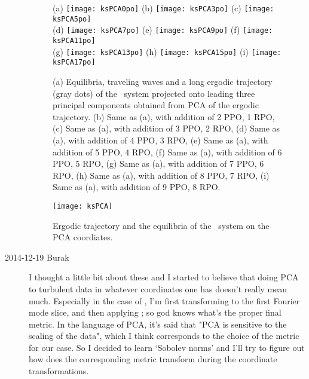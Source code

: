 \begin{description}
\begin{figure}%
\begin{center}
   (a) \texttt{[image: ksPCA0po]}
   (b) \texttt{[image: ksPCA3po]}
   (c) \texttt{[image: ksPCA5po]} \\
   (d) \texttt{[image: ksPCA7po]}
   (e) \texttt{[image: ksPCA9po]}
   (f) \texttt{[image: ksPCA11po]} \\
   (g) \texttt{[image: ksPCA13po]}
   (h) \texttt{[image: ksPCA15po]}
   (i) \texttt{[image: ksPCA17po]}
\end{center}
   \caption{(a) Equilibria, traveling waves and a long ergodic
         trajectory (gray dots) of the \KS\ system projected
         onto leading three principal components obtained
         from PCA of the ergodic trajectory.
         (b) Same as (a), with addition of 2 PPO, 1 RPO,
         (c) Same as (a), with addition of 3 PPO, 2 RPO,
         (d) Same as (a), with addition of 4 PPO, 3 RPO,
         (e) Same as (a), with addition of 5 PPO, 4 RPO,
         (f) Same as (a), with addition of 6 PPO, 5 RPO,
         (g) Same as (a), with addition of 7 PPO, 6 RPO,
         (h) Same as (a), with addition of 8 PPO, 7 RPO,
         (i) Same as (a), with addition of 9 PPO, 8 RPO.
         }
  \label{f-ksPCAnpo}
\end{figure}


\begin{figure}[h]
  \centering
  \texttt{[image: ksPCA]}
  \caption{Ergodic trajectory and the equilibria of the \KS\ system on
         the PCA coordiates.}
  \label{f-ksPCA}
\end{figure}

\item[2014-12-19 Burak] I thought a little bit about these and I started to
believe that doing PCA to turbulent data in whatever coordinates one has
doesn't really mean much. Especially in the case of \KS , I'm first
transforming to the first Fourier mode slice, and then applying
; so god knows what's the proper final metric. In the
language of PCA, it's said that "PCA is sensitive to the scaling of the
data", which I think corresponds to the choice of the metric for our case.
So I decided to learn `Sobolev norms' and I'll try to figure out how does
the corresponding metric transform during the coordinate transformations.


\end{description}

